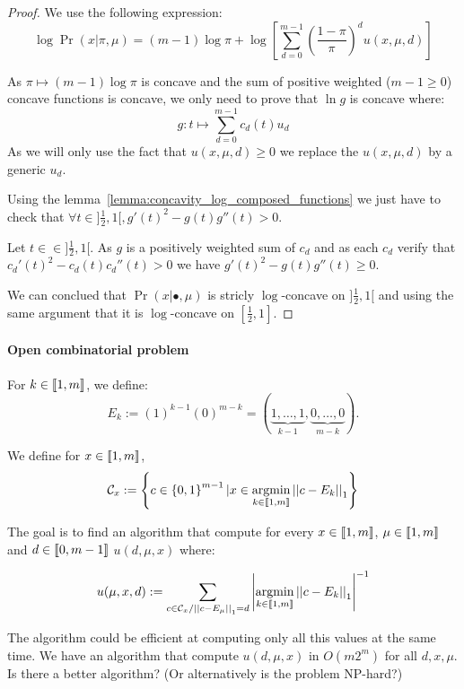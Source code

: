 \begin{proof}
    We use the following expression:
    \[\log\Pr(x | \pi, \mu) = (m-1)\log \pi + \log\left[ \sum_{d = 0}^{m-1} \left(\frac{1 - \pi}{\pi}\right)^d u(x, \mu, d) \right] \] 

    As $\pi \mapsto (m-1) \log\pi$ is concave and the sum of positive weighted ($m - 1 \geq 0$) concave functions is concave, we only need to prove that $\ln g$ is concave where:
    \[g: t\mapsto \sum_{d=0}^{m-1} c_d(t) u_d \]
    As we will only use the fact that $u(x, \mu, d) \geq 0$ we replace the $u(x, \mu, d)$ by a generic $u_d$. 

    Using the lemma~\ref{lemma:concavity_log_composed_functions} we just have to check that $\forall t \in ]\frac{1}{2}, 1[, g'(t)^2 - g(t) g''(t) > 0$.

    Let $t \in \in ]\frac{1}{2}, 1[$. As $g$ is a positively weighted sum of $c_d$ and as each $c_d$ verify that $c_d'(t)^2 - c_d(t) c_d''(t) > 0$ we have $g'(t)^2 - g(t) g''(t) \geq 0$.
    
    We can conclued that $\Pr(x | \bullet, \mu)$ is stricly $\log$-concave on $]\frac{1}{2}, 1[$ and using the same argument that it is $\log$-concave on $[\frac{1}{2}, 1]$.
\end{proof}


\newpage
\paragraph{Open combinatorial problem}


\begin{definition}
    For $k \in \left\llbracket1, m\right\rrbracket$, we define:
    \[E_k := (1)^{k - 1} (0)^{m - k} = (\underset{k - 1}{\underbrace{1, \dots, 1}}, \underset{m - k}{\underbrace{0, \dots, 0}} ). \]
\end{definition}

We define for $x \in \left\llbracket1, m\right\rrbracket$, 
\[ \mathcal{C}_x := \left\{ c \in \left\{ 0, 1 \right\}^{m - 1} | x \in \operatorname*{argmin}_{k \in \left\llbracket1, m\right\rrbracket} \left|\left|c - E_k\right|\right|_1  \right\} \]

The goal is to find an algorithm that compute for every $x \in \left\llbracket1, m\right\rrbracket$, $\mu \in \left\llbracket1, m\right\rrbracket$ and $d \in \left\llbracket0, m - 1\right\rrbracket$ $u(d, \mu, x)$ where:

\[ u(\mu, x, d) := \sum_{c \in \mathcal{C}_x / \left|\left|c-E_{\mu}\right|\right|_1 = d} \left|\operatorname*{argmin}_{k \in \left\llbracket1, m\right\rrbracket} \left|\left|c - E_k\right|\right|_1\right|^{-1} \]

The algorithm could be efficient at computing only all this values at the same time.
We have an algorithm that compute $u(d, \mu, x)$ in $O(m 2^m)$ for all $d,x,\mu$. Is there a better algorithm? (Or alternatively is the problem NP-hard?)

